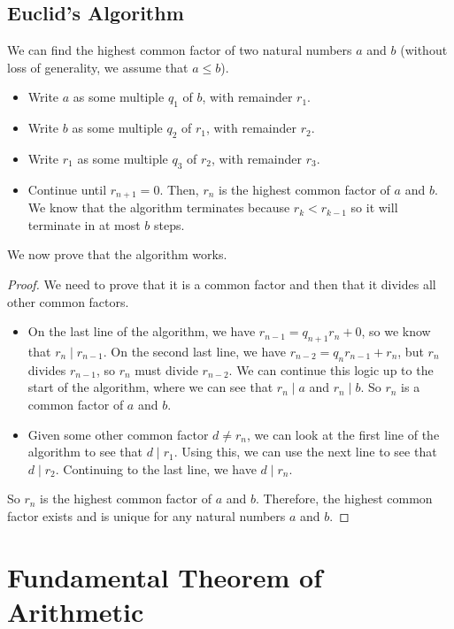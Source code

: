 \documentclass{article}
\begin{document}
\subsection{Euclid's Algorithm}
We can find the highest common factor of two natural numbers $a$ and $b$ (without loss of generality, we assume that $a \leq b$).
\begin{itemize}
	\item Write $a$ as some multiple $q_1$ of $b$, with remainder $r_1$.
	\item Write $b$ as some multiple $q_2$ of $r_1$, with remainder $r_2$.
	\item Write $r_1$ as some multiple $q_3$ of $r_2$, with remainder $r_3$.
	\item Continue until $r_{n+1}=0$. Then, $r_n$ is the highest common factor of $a$ and $b$. We know that the algorithm terminates because $r_k < r_{k-1}$ so it will terminate in at most $b$ steps.
\end{itemize}
We now prove that the algorithm works.
\begin{proof}
	We need to prove that it is a common factor and then that it divides all other common factors.
	\begin{itemize}
		\item On the last line of the algorithm, we have $r_{n-1} = q_{n+1} r_n + 0$, so we know that $r_n \mid r_{n-1}$. On the second last line, we have $r_{n-2} = q_n r_{n-1} + r_n$, but $r_n$ divides $r_{n-1}$, so $r_n$ must divide $r_{n-2}$. We can continue this logic up to the start of the algorithm, where we can see that $r_n \mid a$ and $r_n \mid b$. So $r_n$ is a common factor of $a$ and $b$.
		\item Given some other common factor $d \neq r_n$, we can look at the first line of the algorithm to see that $d \mid r_1$. Using this, we can use the next line to see that $d \mid r_2$. Continuing to the last line, we have $d \mid r_n$.
	\end{itemize}
	So $r_n$ is the highest common factor of $a$ and $b$. Therefore, the highest common factor exists and is unique for any natural numbers $a$ and $b$.
\end{proof}

\section{Fundamental Theorem of Arithmetic}
\end{document}
